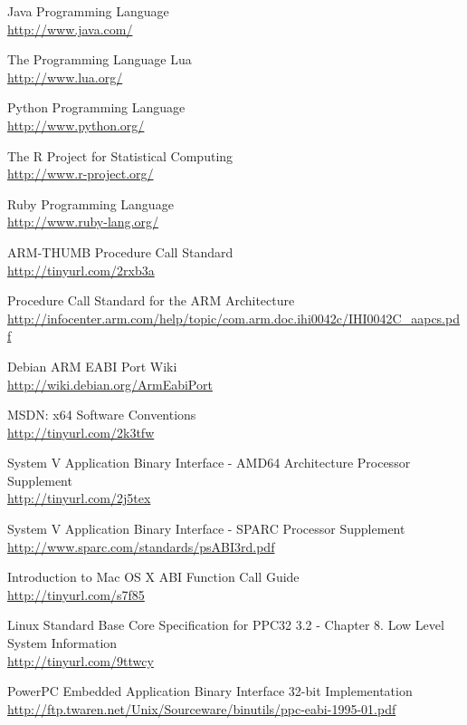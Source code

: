 \begin{thebibliography}{14}
	Java Programming Language\\
	\url{http://www.java.com/}

	The Programming Language Lua\\
	\url{http://www.lua.org/}

	Python Programming Language\\
	\url{http://www.python.org/}

	The R Project for Statistical Computing\\
	\url{http://www.r-project.org/}

	Ruby Programming Language\\
	\url{http://www.ruby-lang.org/}

	ARM-THUMB Procedure Call Standard\\
	\url{http://tinyurl.com/2rxb3a}

        Procedure Call Standard for the ARM Architecture\\
        \url{http://infocenter.arm.com/help/topic/com.arm.doc.ihi0042c/IHI0042C_aapcs.pdf}

	Debian ARM EABI Port Wiki\\
	\url{http://wiki.debian.org/ArmEabiPort}

	MSDN: x64 Software Conventions\\
	\url{http://tinyurl.com/2k3tfw}

	System V Application Binary Interface - AMD64 Architecture Processor Supplement\\
	\url{http://tinyurl.com/2j5tex}

	System V Application Binary Interface - SPARC Processor Supplement\\
	\url{http://www.sparc.com/standards/psABI3rd.pdf}

	Introduction to Mac OS X ABI Function Call Guide\\
	\url{http://tinyurl.com/s7f85}

	Linux Standard Base Core Specification for PPC32 3.2 - Chapter 8. Low Level System Information\\
	\url{http://tinyurl.com/9ttwcy}

        PowerPC Embedded Application Binary Interface 32-bit Implementation\\
        \url{http://ftp.twaren.net/Unix/Sourceware/binutils/ppc-eabi-1995-01.pdf}


\end{thebibliography}
